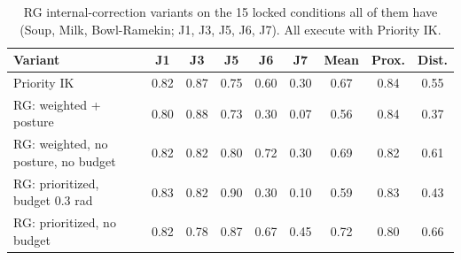 \begin{table}[t]
\centering
\caption{RG internal-correction variants on the 15 locked conditions all of them have (Soup, Milk, Bowl-Ramekin; J1, J3, J5, J6, J7). All execute with Priority IK.}
\label{tab:rg_factors_means}
\setlength{\tabcolsep}{3pt}
\begin{tabular}{lcccccccc}
\toprule
Variant & J1 & J3 & J5 & J6 & J7 & Mean & Prox. & Dist. \\
\midrule
Priority IK & 0.82 & 0.87 & 0.75 & 0.60 & 0.30 & 0.67 & 0.84 & 0.55 \\
RG: weighted + posture & 0.80 & 0.88 & 0.73 & 0.30 & 0.07 & 0.56 & 0.84 & 0.37 \\
RG: weighted, no posture, no budget & 0.82 & 0.82 & 0.80 & 0.72 & 0.30 & 0.69 & 0.82 & 0.61 \\
RG: prioritized, budget 0.3 rad & 0.83 & 0.82 & 0.90 & 0.30 & 0.10 & 0.59 & 0.83 & 0.43 \\
RG: prioritized, no budget & 0.82 & 0.78 & 0.87 & 0.67 & 0.45 & 0.72 & 0.80 & 0.66 \\
\bottomrule
\end{tabular}
\end{table}
